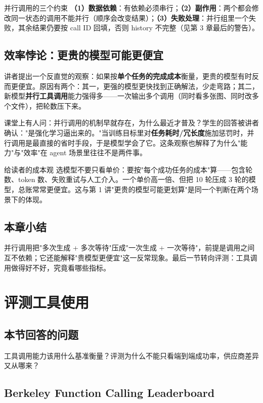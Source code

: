 \documentclass[a4paper]{article}
\begin{document}
\begin{importantbox}{并行调用的三个约束}
\textbf{（1）数据依赖}：有依赖必须串行；\textbf{（2）副作用}：两个都会修改同一状态的调用不能并行（顺序会改变结果）；\textbf{（3）失败处理}：并行组里一个失败，其余结果仍要按 call ID 回填，否则 history 不完整（见第 3 章最后的警告）。
\end{importantbox}

\subsection{效率悖论：更贵的模型可能更便宜}

讲者提出一个反直觉的观察：如果按\textbf{单个任务的完成成本}衡量，更贵的模型有时反而更便宜。原因有两个：其一，更强的模型更快找到正确解法，少走弯路；其二，新模型\textbf{并行工具调用}能力强得多——一次输出多个调用（同时看多张图、同时改多个文件），把轮数压下来。

课堂上有人问：并行调用的机制早就存在，为什么最近才普及？学生的回答被讲者确认："是强化学习逼出来的。"当训练目标里对\textbf{任务耗时/冗长度}施加惩罚时，并行调用是最直接的省时手段，于是模型学会了它。这条观察也解释了为什么"能力"与"效率"在 agent 场景里往往不是两件事。

\begin{knowledgebox}{给读者的成本观}
选模型不要只看单价：要按"每个成功任务的成本"算——包含轮数、token 数、失败重试与人工介入。一个单价高一倍、但把 10 轮压成 3 轮的模型，总账常常更便宜。这与第 1 讲"更贵的模型可能更划算"是同一个判断在两个场景下的体现。
\end{knowledgebox}

\subsection{本章小结}
并行调用把"多次生成 + 多次等待"压成"一次生成 + 一次等待"，前提是调用之间互不依赖；它还能解释"贵模型更便宜"这一反常现象。最后一节转向评测：工具调用做得好不好，究竟看哪些指标。

\section{评测工具使用}

\subsection*{本节回答的问题}
工具调用能力该用什么基准衡量？评测为什么不能只看端到端成功率，供应商差异又从哪来？

\subsection{Berkeley Function Calling Leaderboard}
\end{document}
